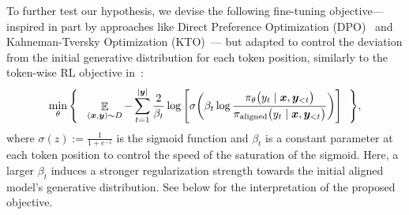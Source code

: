 To further test our hypothesis, we devise the following fine-tuning objective---inspired in part by approaches like Direct Preference Optimization (DPO)~\citep{rafailov2023direct} and Kahneman-Tversky Optimization (KTO)~\citep{ethayarajh2024kto}--- but adapted to control the deviation from the initial generative distribution for each token position, similarly to the token-wise RL objective in~\citep{mudgal2024controlled}:
\begin{align}
    \min_{\theta} \Bigg\{ \ \ \mathop{\mathbb E}_{(\bx,\by)\sim D} -  \sum_{t=1}^{|\by|} \frac{2}{\beta_t} \log\Bigg[\sigma \bigg( \beta_t \log \frac{\pi_{\theta}\big(y_t \mid \bx, \by_{<t} \big)}{\pialigned\big(y_t \mid \bx, \by_{<t} \big)}  \bigg)  \Bigg] \ \ \Bigg\},
\label{eqn:soft-sft-fine-tuning-loss}
\end{align}
where $\sigma(z) := \frac{1}{1 + e^{-z}}$ is the sigmoid function and $\beta_t$ is a constant parameter at each token position to control the speed of the saturation of the sigmoid.
Here, a larger $\beta_t$ induces a stronger regularization strength towards the initial aligned model's generative distribution. See below for the interpretation of the proposed objective. 




